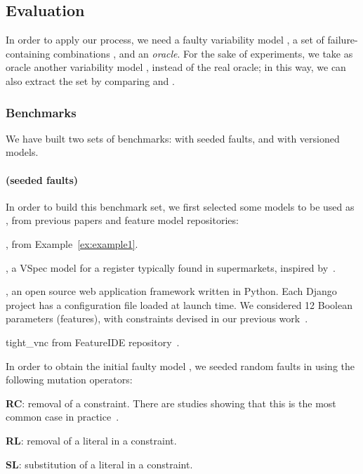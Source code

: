 \begin{tikzborder}{\cite{Gargantini16:validation}}
\begin{tikzborder}{\cite{gargantini_combinatorial_2017}}
\begin{tikzborder}{\cite{garn2019}}
\begin{tikzborder}{\cite{arcaini2019achieving}}
\begin{tikzborder}{\cite{arcaini2019varivolution}}
		\subsection{Evaluation}\label{sec:repairevaluation}
		
		\bb In order to apply our process, we need a faulty variability model \m, a set of failure-containing combinations \fccSet, and an {\it oracle}. For the sake of experiments, we take as oracle another variability model \mO, instead of the real oracle; in this way, we can also extract the set \fccSet by comparing \m and \mO. \be
		
		\subsubsection{Benchmarks}
		
		\bb We have built two sets of benchmarks: \benchMut with seeded faults, and \benchReal with versioned models.\be
		
		\paragraph{\benchMut (seeded faults)} 
		\bb In order to build this benchmark set, we first selected some models to be used as \mO, from previous papers and feature model repositories:
		\begin{compactitem}
			\item \exampleM, from Example~\ref{ex:example1}.
			\item \register, a VSpec model for a register typically found in supermarkets, inspired by~\cite{Shimbara2015}.
			\item \django, an open source web application framework written in Python. Each Django project has a configuration file loaded at launch time. We considered 12 Boolean parameters (features), with constraints devised in our previous work~\cite{gargantini_combinatorial_2017}.
			\item \textsf{tight\_vnc} from FeatureIDE repository~\cite{FeatureIDEbook}.
		\end{compactitem}
		In order to obtain the initial faulty model \m, we seeded random faults in \mO using the following mutation operators:
		\begin{compactitem}
			\item \textbf{\textsf{RC}}: removal of a constraint. There are studies showing that this is the most common case in practice~\cite{lotufo_evolution_2010}.
			\item \textbf{\textsf{RL}}: removal of a literal in a constraint.
			\item \textbf{\textsf{SL}}: substitution of a literal in a constraint.
		\end{compactitem}
		

\end{tikzborder}
\end{tikzborder}
\end{tikzborder}
\end{tikzborder}
\end{tikzborder}

